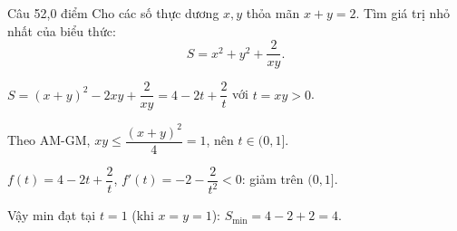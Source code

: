 \begin{de_cau}{Câu 5}{2,0 điểm}
Cho các số thực dương $x, y$ thỏa mãn $x + y = 2$. Tìm giá trị nhỏ nhất của biểu thức:
\[S = x^2 + y^2 + \dfrac{2}{xy}.\]
\end{de_cau}

\begin{loi_giai_cau}
$S = (x+y)^2-2xy+\dfrac{2}{xy} = 4 - 2t + \dfrac{2}{t}$ với $t=xy>0$.

Theo AM-GM, $xy \le \dfrac{(x+y)^2}{4}=1$, nên $t\in(0,1]$.

$f(t)=4-2t+\dfrac{2}{t}$, $f'(t)=-2-\dfrac{2}{t^2}<0$: giảm trên $(0,1]$.

Vậy min đạt tại $t=1$ (khi $x=y=1$): $S_{\min}=4-2+2=\boxed{4}$.
\end{loi_giai_cau}
